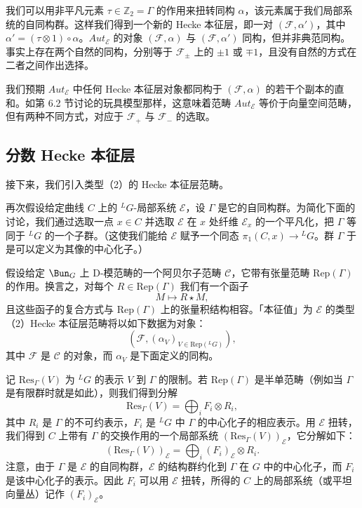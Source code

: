 我们可以用非平凡元素 $\tau\in\mathbb{Z}_2 = \Gamma$ 的作用来扭转同构 $\alpha$，该元素属于我们局部系统的自同构群。这样我们得到一个新的 Hecke 本征层，即一对 $(\mathcal{F},\alpha')$，其中 $\alpha' = (\tau\otimes1)\circ\alpha$。$Aut_{\mathcal{E}}$ 的对象 $(\mathcal{F},\alpha)$ 与 $(\mathcal{F},\alpha')$ 同构，但并非典范同构。事实上存在两个自然的同构，分别等于 $\mathcal{F}_\pm$ 上的 $\pm1$ 或 $\mp1$，且没有自然的方式在二者之间作出选择。

我们预期 $Aut_{\mathcal{E}}$ 中任何 Hecke 本征层对象都同构于 $(\mathcal{F},\alpha)$ 的若干个副本的直和。如第 6.2 节讨论的玩具模型那样，这意味着范畴 $Aut_{\mathcal{E}}$ 等价于向量空间范畴，但有两种不同方式，对应于 $\mathcal{F}_+$ 与 $\mathcal{F}_-$ 的选取。

\subsection{分数 Hecke 本征层}

接下来，我们引入类型（2）的 Hecke 本征层范畴。

再次假设给定曲线 $C$ 上的 ${}^LG$-局部系统 $\mathcal{E}$，设 $\Gamma$ 是它的自同构群。为简化下面的讨论，我们通过选取一点 $x\in C$ 并选取 $\mathcal{E}$ 在 $x$ 处纤维 $\mathcal{E}_x$ 的一个平凡化，把 $\Gamma$ 等同于 ${}^LG$ 的一个子群。（这使我们能给 $\mathcal{E}$ 赋予一个同态 $\pi_1(C,x)\to{}^LG$。群 $\Gamma$ 于是可以定义为其像的中心化子。）

假设给定 $\Bun_G$ 上 D-模范畴的一个阿贝尔子范畴 $\mathcal{C}$，它带有张量范畴 $\mathrm{Rep}(\Gamma)$ 的作用。换言之，对每个 $R\in\mathrm{Rep}(\Gamma)$ 我们有一个函子
\[
M\mapsto R\star M,
\]
且这些函子的复合方式与 $\mathrm{Rep}(\Gamma)$ 上的张量积结构相容。「本征值」为 $\mathcal{E}$ 的类型（2）Hecke 本征层范畴将以如下数据为对象：
\begin{equation}\tag{6.9}
(\mathcal{F},(\alpha_V)_{V\in\mathrm{Rep}({}^LG)}),
\end{equation}
其中 $\mathcal{F}$ 是 $\mathcal{C}$ 的对象，而 $\alpha_V$ 是下面定义的同构。

记 $\mathrm{Res}_\Gamma(V)$ 为 ${}^LG$ 的表示 $V$ 到 $\Gamma$ 的限制。若 $\mathrm{Rep}(\Gamma)$ 是半单范畴（例如当 $\Gamma$ 是有限群时就是如此），则我们得到分解
\[
\mathrm{Res}_\Gamma(V) = \bigoplus_i F_i\otimes R_i,
\]
其中 $R_i$ 是 $\Gamma$ 的不可约表示，$F_i$ 是 ${}^LG$ 中 $\Gamma$ 的中心化子的相应表示。用 $\mathcal{E}$ 扭转，我们得到 $C$ 上带有 $\Gamma$ 的交换作用的一个局部系统 $(\mathrm{Res}_\Gamma(V))_{\mathcal{E}}$，它分解如下：
\[
(\mathrm{Res}_\Gamma(V))_{\mathcal{E}} = \bigoplus_i (F_i)_{\mathcal{E}}\otimes R_i.
\]
注意，由于 $\Gamma$ 是 $\mathcal{E}$ 的自同构群，$\mathcal{E}$ 的结构群约化到 $\Gamma$ 在 $G$ 中的中心化子，而 $F_i$ 是该中心化子的表示。因此 $F_i$ 可以用 $\mathcal{E}$ 扭转，所得的 $C$ 上的局部系统（或平坦向量丛）记作 $(F_i)_{\mathcal{E}}$。

